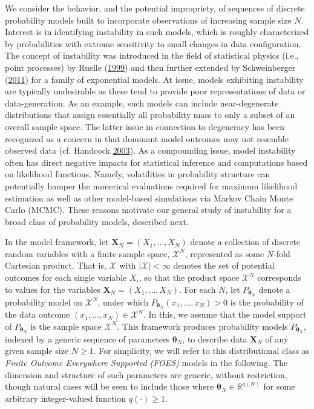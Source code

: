 \documentclass[]{article}
\theoremstyle{definition}
\begin{document}
We consider the behavior, and the potential impropriety, of sequences of
discrete probability models built to incorporate observations of
increasing sample size \(N\). Interest is in identifying instability in
such models, which is roughly characterized by probabilities with
extreme sensitivity to small changes in data configuration. The concept
of instability was introduced in the field of statistical physics (i.e.,
point processes) by Ruelle
(\protect\hyperlink{ref-ruelle1999statistical}{1999}) and then further
extended by Schweinberger
(\protect\hyperlink{ref-schweinberger2011instability}{2011}) for a
family of exponential models. At issue, models exhibiting instability
are typically undesirable as these tend to provide poor representations
of data or data-generation. As an example, such models can include
near-degenerate distributions that assign essentially all probability
mass to only a subset of an overall sample space. The latter issue in
connection to degeneracy has been recognized as a concern in that
dominant model outcomes may not resemble observed data (cf. Handcock
\protect\hyperlink{ref-handcock2003assessing}{2003}). As a compounding
issue, model instability often has direct negative impacts for
statistical inference and computations based on likelihood functions.
Namely, volatilities in probability structure can potentially hamper the
numerical evaluations required for maximum likelihood estimation as well
as other model-based simulations via Markov Chain Monte Carlo (MCMC).
These reasons motivate our general study of instability for a broad
class of probability models, described next.

In the model framework, let \(\boldsymbol X_N = (X_1, \dots, X_N)\)
denote a collection of discrete random variables with a finite sample
space, \(\mathcal{X}^N\), represented as some \(N\)-fold Cartesian
product. That is, \(\mathcal{X}\) with \(|\mathcal{X}| < \infty\)
denotes the set of potential outcomes for each single variable \(X_i\),
so that the product space \(\mathcal{X}^N\) corresponds to values for
the variables \(\boldsymbol X_N=(X_1,\ldots,X_N)\). For each \(N\), let
\(P_{\boldsymbol \theta_N}\) denote a probability model on
\(\mathcal{X}^N\), under which
\(P_{\boldsymbol \theta_N}(x_1, \dots, x_N) > 0\) is the probability of
the data outcome \((x_1, \dots, x_N) \in \mathcal{X}^N\). In this, we
assume that the model support of \(P_{\boldsymbol \theta_N}\) is the
sample space \(\mathcal{X}^N\). This framework produces probability
models \(P_{\boldsymbol \theta_N}\), indexed by a generic sequence of
parameters \(\boldsymbol \theta_N\), to describe data
\(\boldsymbol X_N\) of any given sample size \(N \geq 1\). For
simplicity, we will refer to this distributional class as \emph{Finite
Outcome Everywhere Supported (FOES)} models in the following. The
dimension and structure of such parameters are generic, without
restriction, though natural cases will be seen to include those where
\(\boldsymbol \theta_N \in \mathbb{R}^{q(N)}\) for some arbitrary
integer-valued function \(q(\cdot) \geq 1\).
\end{document}
